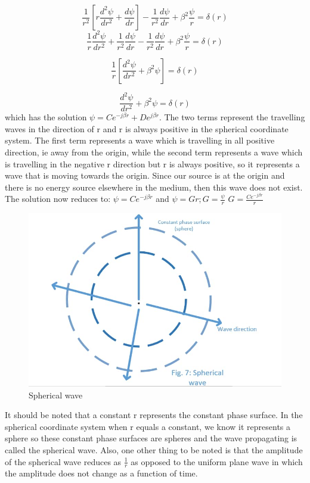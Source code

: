 $$\frac{1}{r^{2}}[r\frac{d^{2}\psi}{dr^{2}} + \frac{d\psi}{dr}] - \frac{1}{r^{2}}\frac{d\psi}{dr} + \beta^{2}\frac{\psi}{r} = \delta(r)$$
$$\frac{1}{r}\frac{d^{2}\psi}{dr^{2}} + \frac{1}{r^{2}}\frac{d\psi}{dr} - \frac{1}{r^{2}}\frac{d\psi}{dr} + \beta^{2}\frac{\psi}{r} = \delta(r)$$

$$\frac{1}{r}[\frac{d^{2}\psi}{dr^{2}} + \beta^{2}\psi] = \delta(r)$$

$$\frac{d^{2}\psi}{dr^{2}} + \beta^{2}\psi = \delta(r)$$
which has the solution $\psi = Ce^{-j\beta r} + De^{j\beta r}$. The two terms represent the travelling waves in the direction of r and r is always positive in the spherical  coordinate system. The first term represents a wave which is travelling in all positive direction, ie away from the origin, while the second term represents a wave which is travelling in the negative r direction but r is always positive, so it represents a wave that is moving towards the origin. Since our source is at the origin and there is no energy source elsewhere in the medium, then this wave does not exist. The solution now reduces to:
$\psi = Ce^{-j\beta r}$ and $\psi = Gr; G = \frac{\psi}{r}$
$G = \frac{Ce^{-j\beta r}}{r}$
\begin{figure}[h]
\centering
\includegraphics[width=\linewidth]{./graphics/img_1}
\caption{Spherical wave}
\label{fig:1}
\end{figure}
It should be noted that a constant r represents the constant phase surface. In the spherical coordinate system when r equals a constant, we know it represents a sphere so these constant phase surfaces are spheres and the wave propagating is called the spherical wave. Also, one other thing to be noted is that the amplitude of the spherical wave reduces as $\frac{1}{r}$ as opposed to the uniform  plane wave in which the amplitude does not change as a function of time.

